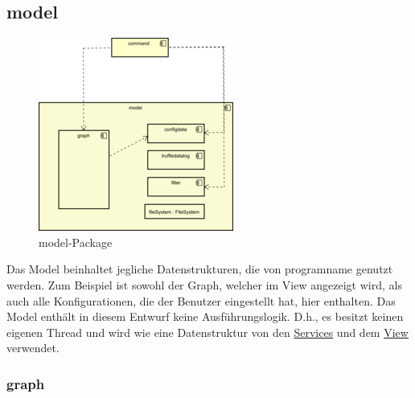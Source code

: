 \subsection{model}
\label{subsec:model}

\begin{figure}[H]
  \centering
  \includegraphics[width=\textwidth]{../diagramimages/model.png}
  \caption{model-Package}
\end{figure}

\medskip
Das Model beinhaltet jegliche Datenstrukturen, die von \gls{programname} genutzt
werden. Zum Beispiel ist sowohl der Graph, welcher im View angezeigt wird,
als auch alle Konfigurationen, die der Benutzer eingestellt hat, hier enthalten. Das Model enthält in diesem Entwurf keine Ausführungslogik.
D.h., es besitzt keinen eigenen Thread und wird wie eine Datenstruktur von den
\hyperref[subsec:service]{Services} und dem \hyperref[subsec:view]{View} verwendet.

    \subsubsection{graph}
    \label{subsubsec:graph}

